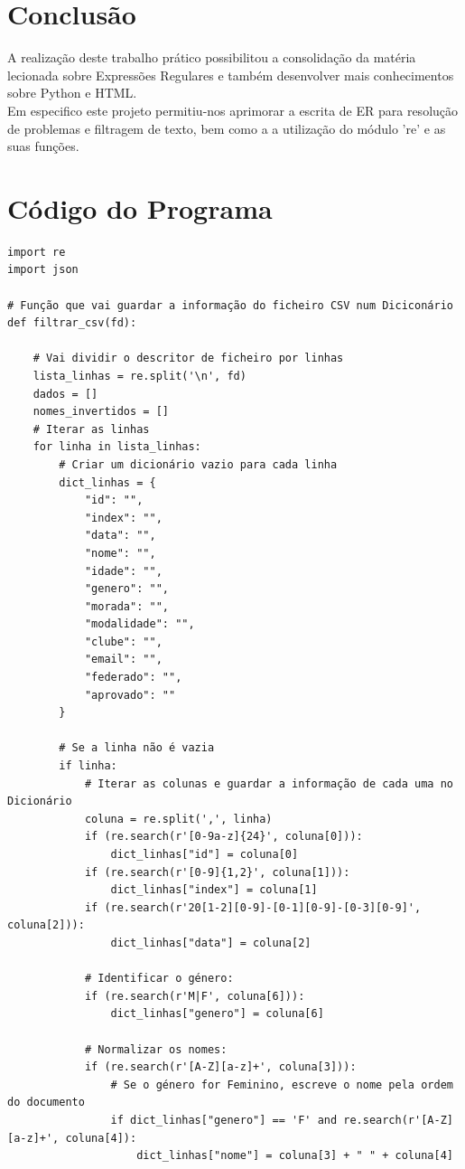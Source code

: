\documentclass[11pt,a4paper]{report}%
\begin{document}
\chapter{Conclusão} \label{concl}
A realização deste trabalho prático possibilitou a consolidação da matéria lecionada sobre Expressões Regulares e também desenvolver mais conhecimentos sobre Python e HTML.\\
Em especifico este projeto permitiu-nos aprimorar a escrita de ER para resolução de problemas e filtragem de texto, bem como a a utilização do módulo 're' e as suas funções.\\
\appendix %
\chapter{Código do Programa}
\begin{verbatim}
import re
import json

# Função que vai guardar a informação do ficheiro CSV num Diciconário               
def filtrar_csv(fd):

    # Vai dividir o descritor de ficheiro por linhas
    lista_linhas = re.split('\n', fd)
    dados = []
    nomes_invertidos = []
    # Iterar as linhas
    for linha in lista_linhas:
        # Criar um dicionário vazio para cada linha
        dict_linhas = {
            "id": "",
            "index": "",
            "data": "",
            "nome": "",
            "idade": "",
            "genero": "",
            "morada": "",
            "modalidade": "",
            "clube": "",
            "email": "",
            "federado": "",
            "aprovado": ""
        }

        # Se a linha não é vazia
        if linha:
            # Iterar as colunas e guardar a informação de cada uma no Dicionário
            coluna = re.split(',', linha)
            if (re.search(r'[0-9a-z]{24}', coluna[0])):
                dict_linhas["id"] = coluna[0]
            if (re.search(r'[0-9]{1,2}', coluna[1])):
                dict_linhas["index"] = coluna[1]
            if (re.search(r'20[1-2][0-9]-[0-1][0-9]-[0-3][0-9]', coluna[2])):
                dict_linhas["data"] = coluna[2]

            # Identificar o género:
            if (re.search(r'M|F', coluna[6])):
                dict_linhas["genero"] = coluna[6]

            # Normalizar os nomes:    
            if (re.search(r'[A-Z][a-z]+', coluna[3])):
                # Se o género for Feminino, escreve o nome pela ordem do documento
                if dict_linhas["genero"] == 'F' and re.search(r'[A-Z][a-z]+', coluna[4]):
                    dict_linhas["nome"] = coluna[3] + " " + coluna[4]


\end{verbatim}
\end{document}
